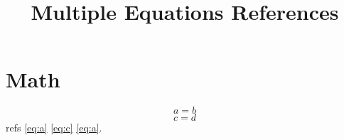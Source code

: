 \documentclass{article}
\begin{document}
\title{Multiple Equations References}\maketitle
\section{Math}\begin{equation}a=b\label{eq:a}\end{equation}\begin{equation}c=d\label{eq:c}\end{equation} refs \ref{eq:a} \ref{eq:c} \ref{eq:a}.
\end{document}

